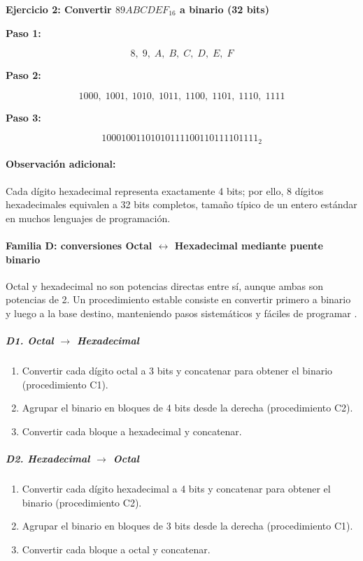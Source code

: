 \documentclass[12pt,twoside]{book}
\begin{document}
						\bigskip
						
						\noindent
						\textbf{Ejercicio 2: Convertir $89ABCDEF_{16}$ a binario (32 bits)}
						
						\noindent
						\textbf{Paso 1:}
						
						\[
						8,\;9,\;A,\;B,\;C,\;D,\;E,\;F
						\]
						
						\noindent
						\textbf{Paso 2:}
						
						\[
						1000,\;1001,\;1010,\;1011,\;1100,\;1101,\;1110,\;1111
						\]
						
						\noindent
						\textbf{Paso 3:}
						
						\[
						10001001101010111100110111101111_2
						\]
						
						\noindent
						\paragraph{Observación adicional:} Cada dígito hexadecimal representa exactamente 4 bits; por ello, 8 dígitos hexadecimales equivalen a 32 bits completos, tamaño típico de un entero estándar en muchos lenguajes de programación.
						
						\paragraph{Familia D: conversiones Octal $\leftrightarrow$ Hexadecimal mediante puente binario}
						Octal y hexadecimal no son potencias directas entre sí, aunque ambas son potencias de 2. Un procedimiento estable consiste en convertir primero a binario y luego a la base destino, manteniendo pasos sistemáticos y fáciles de programar \cite{Tanenbaum2021Structured,Hanly2015Problem,Gaddis2022Starting}.
						
						\subparagraph{D1. Octal $\rightarrow$ Hexadecimal}
						\begin{enumerate}
							\item Convertir cada dígito octal a 3 bits y concatenar para obtener el binario (procedimiento C1).
							\item Agrupar el binario en bloques de 4 bits desde la derecha (procedimiento C2).
							\item Convertir cada bloque a hexadecimal y concatenar.
						\end{enumerate}
						
						\subparagraph{D2. Hexadecimal $\rightarrow$ Octal}
						\begin{enumerate}
							\item Convertir cada dígito hexadecimal a 4 bits y concatenar para obtener el binario (procedimiento C2).
							\item Agrupar el binario en bloques de 3 bits desde la derecha (procedimiento C1).
							\item Convertir cada bloque a octal y concatenar.
						\end{enumerate}
						
\end{document}
